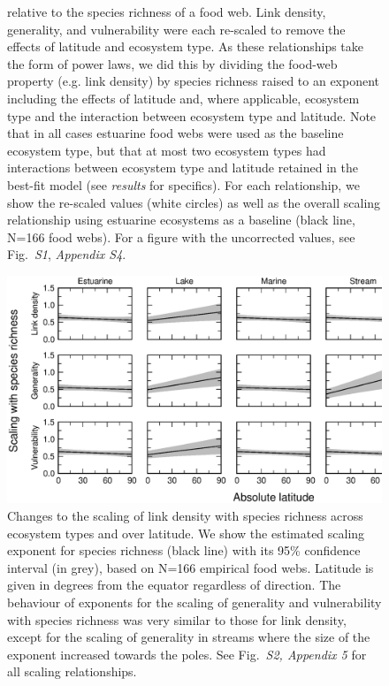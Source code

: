 \documentclass[12pt]{article}
\begin{document}
\begin{figure}[h]
{relative to the species richness of a food web. Link density, generality,
and vulnerability were each re-scaled to remove the effects of latitude and ecosystem
type. As these relationships take the form of power laws, we did this by dividing the food-web
property (e.g. link density) by species richness raised to an exponent including the 
effects of latitude and, where applicable, ecosystem type and the interaction between ecosystem
type and latitude. Note that in all cases estuarine food webs were used as the baseline 
ecosystem type, but that at most two ecosystem types had interactions between ecosystem type and
latitude retained in the best-fit model (see \emph{results} for specifics). For each relationship, 
we show the re-scaled values (white circles) as well as the overall scaling relationship using estuarine
ecosystems as a baseline (black line, N=166 food webs). For a figure with the uncorrected values,
see Fig.~\emph{S1}, \emph{Appendix S4}.}
\label{props_v_lat}
\end{figure}


\begin{figure}[h]
\centerline{\includegraphics*[width=.85\textwidth]{Figures/by_TL/marginal/S_marginal_latitude_proportions.eps}}
\caption{Changes to the scaling of link density with species richness across ecosystem
types and over latitude. We show the estimated scaling exponent for species richness (black
line) with its 95\% confidence interval (in grey), based on N=166 empirical food webs.
Latitude is given in degrees from the equator regardless of direction. The
behaviour of exponents for the scaling of generality and vulnerability with
species richness was very  similar to those for link density, except for the
scaling of generality in streams where  the size of the exponent increased
towards the poles. See Fig.~\emph{S2, Appendix 5} for  all scaling
relationships.} \label{S} \end{figure}
\end{document}
